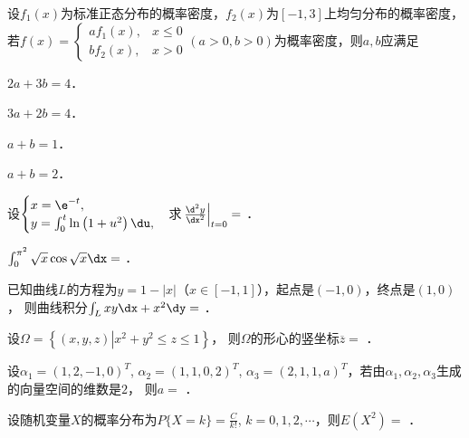 \documentclass[plain,noanswer,medmath]{../../template/jnuexam}
\begin{document}
\begin{problem}
设$f_1(x)$为标准正态分布的概率密度，$f_2(x)$为$\left[- 1,3 \right]$上均匀分布的概率密度，若$f(x) = \begin{cases}
  af_1(x), & x \le 0 \\
  bf_2(x), & x > 0
\end{cases}$$(a > 0,b > 0)$为概率密度，则$a,b$应满足\pickout{}
\begin{abcd}
\item $2a + 3b = 4$．
\item $3a + 2b = 4$．
\item $a + b = 1$．
\item $a + b = 2$．
\end{abcd}
\end{problem}




\begin{problem}
设$\begin{cases}
  x = \e^{- t}, \\
  y = \int_0^t \ln \left(1 + u^2 \right)\du,
\end{cases}$求$\left. \frac{\d^2y}{\dx^2} \right|_{t = 0} =$ \fillin{}．
\end{problem}


\begin{problem}
$\int_0^{\pi^2} \sqrt{x} \cos \sqrt{x} \dx =$ \fillin{}．
\end{problem}


\begin{problem}
已知曲线$L$的方程为$y = 1 - |x|$（$x\in[-1,1]$），起点是$(- 1,0)$，终点是$(1,0)$，
则曲线积分$\int_L xy\dx + x^2 \dy =$ \fillin{}．
\end{problem}


\begin{problem}
设$\Omega = \left\{\left(x,y,z \right)\left| x^2 + y^2 \le z \le 1 \right. \right\}$，
则$\Omega$的形心的竖坐标$\overline{z} =$ \fillin{}．
\end{problem}


\begin{problem}
设$\alpha_1 = \left(1,2, - 1,0 \right)^T$, $\alpha_2 = \left(1,1,0,2 \right)^T$,
$\alpha_3 = \left(2,1,1,a \right)^T$，若由$\alpha_1,\alpha_2,\alpha_3$生成的向量空间的维数是$2$，
则$a =$ \fillin{}．
\end{problem}


\begin{problem}
设随机变量$X$的概率分布为$P\{X=k\} = \frac{C}{k!}$, $k=0,1,2,\cdots$，则$E\left(X^2\right)=$ \fillin{}．
\end{problem}
\end{document}
